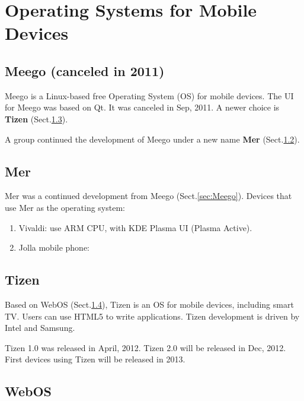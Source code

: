 \chapter{Operating Systems for Mobile Devices}


\section{Meego (canceled in 2011)}
\label{sec:Meeg}

Meego is a Linux-based free Operating System (OS) for mobile devices. The UI
for Meego was based on Qt. It was canceled in Sep, 2011. A newer choice is {\bf
Tizen} (Sect.\ref{sec:Tizen}).


A group continued the development of Meego under a new name {\bf Mer}
(Sect.\ref{sec:Mer}).

\section{Mer}
\label{sec:Mer}

Mer was a continued development from Meego (Sect.\ref{sec:Meego}).
Devices that use Mer as the operating system:
\begin{enumerate}
  \item Vivaldi: use ARM CPU, with KDE Plasma UI (Plasma Active).
  \item Jolla mobile phone: 
\end{enumerate}

\section{Tizen}
\label{sec:Tizen}

Based on WebOS (Sect.\ref{sec:WebOS}), Tizen is an OS for mobile devices,
including smart TV. Users can use HTML5 to write applications. Tizen development
is driven by Intel and Samsung.

Tizen 1.0 was released in April, 2012. Tizen 2.0 will be released in Dec, 2012.
First devices using Tizen will be released in 2013.

\section{WebOS}
\label{sec:WebOS}
